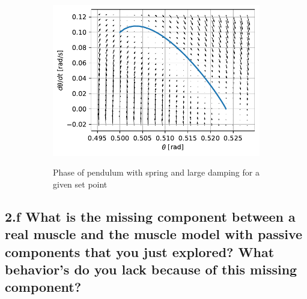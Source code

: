 \documentclass{cmc}
\begin{document}
\begin{figure}[H]
\begin{subfigure}[b]{0.49\textwidth}
{      \includegraphics[width=\textwidth]{figures/Phase_Pendulum_Fixed_Position_with_large_damping_(x0_=_[0dot5,_0dot1]).pdf}
    }
    \caption{Phase of pendulum with spring and large damping for a given set
      point}
    \label{fig:phase-pendulum-spring-large-damper-position}
  \end{subfigure}
  \caption{}
  \label{fig:pendulum-spring-large-damper-position}
\end{figure}


\subsection*{2.f What is the missing component between a real muscle
  and the muscle model with passive components that you just explored?
  What behavior's do you lack because of this missing component?}


\end{document}
